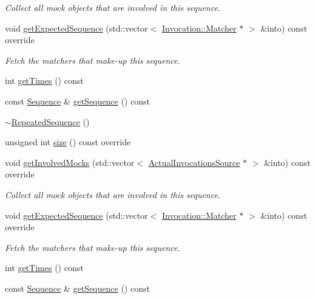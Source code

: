 \begin{DoxyCompactItemize}
\begin{DoxyCompactList}\small\item\em Collect all mock objects that are involved in this sequence. \end{DoxyCompactList}\item 
void \mbox{\hyperlink{classfakeit_1_1RepeatedSequence_a65b5f62fe0ba9da31b99f28c1a2e53f2}{get\+Expected\+Sequence}} (std\+::vector$<$ \mbox{\hyperlink{structfakeit_1_1Invocation_1_1Matcher}{Invocation\+::\+Matcher}} $\ast$ $>$ \&into) const override
\begin{DoxyCompactList}\small\item\em Fetch the matchers that make-\/up this sequence. \end{DoxyCompactList}\item 
int \mbox{\hyperlink{classfakeit_1_1RepeatedSequence_a08eba3d6b4d7740e6a999a75f142948c}{get\+Times}} () const
\item 
const \mbox{\hyperlink{classfakeit_1_1Sequence}{Sequence}} \& \mbox{\hyperlink{classfakeit_1_1RepeatedSequence_ad85825e1b9a47002d468c85f822d7f5e}{get\+Sequence}} () const
\item 
\mbox{\hyperlink{classfakeit_1_1RepeatedSequence_aa45714780e496cf02e8e35f27de5b617}{$\sim$\+Repeated\+Sequence}} ()
\item 
unsigned int \mbox{\hyperlink{classfakeit_1_1RepeatedSequence_a64d52ac14ca69a34e8188e856e6b51a6}{size}} () const override
\item 
void \mbox{\hyperlink{classfakeit_1_1RepeatedSequence_a4271add0945bdf443562df683e77777d}{get\+Involved\+Mocks}} (std\+::vector$<$ \mbox{\hyperlink{structfakeit_1_1ActualInvocationsSource}{Actual\+Invocations\+Source}} $\ast$ $>$ \&into) const override
\begin{DoxyCompactList}\small\item\em Collect all mock objects that are involved in this sequence. \end{DoxyCompactList}\item 
void \mbox{\hyperlink{classfakeit_1_1RepeatedSequence_a65b5f62fe0ba9da31b99f28c1a2e53f2}{get\+Expected\+Sequence}} (std\+::vector$<$ \mbox{\hyperlink{structfakeit_1_1Invocation_1_1Matcher}{Invocation\+::\+Matcher}} $\ast$ $>$ \&into) const override
\begin{DoxyCompactList}\small\item\em Fetch the matchers that make-\/up this sequence. \end{DoxyCompactList}\item 
int \mbox{\hyperlink{classfakeit_1_1RepeatedSequence_a08eba3d6b4d7740e6a999a75f142948c}{get\+Times}} () const
\item 
const \mbox{\hyperlink{classfakeit_1_1Sequence}{Sequence}} \& \mbox{\hyperlink{classfakeit_1_1RepeatedSequence_ad85825e1b9a47002d468c85f822d7f5e}{get\+Sequence}} () const
\end{DoxyCompactItemize}
